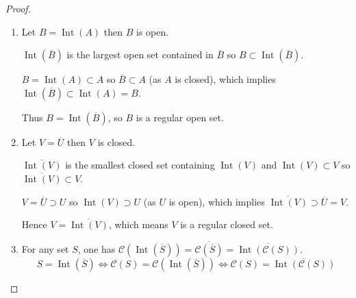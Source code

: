 \begin{proof}
    \begin{enumerate}[leftmargin=*,label={(\alph*)},itemsep=0pt]
        \item Let \( B = \operatorname{Int}(A) \) then \(B\) is open.

              \( \operatorname{Int}(\overline{B}) \) is the largest open set contained in \( \overline{B} \) so \( B \subset \operatorname{Int}(\overline{B}) \).


              \( B = \operatorname{Int}(A) \subset A \) so \( \overline{B} \subset A \) (as \(A\) is closed), which implies \( \operatorname{Int}(\overline{B}) \subset \operatorname{Int}(A) = B \).

              Thus \( B = \operatorname{Int}(\overline{B}) \), so \( B \) is a regular open set.
        \item Let \( V = \overline{U} \) then \( V \) is closed.

              \( \overline{\operatorname{Int}(V)} \) is the smallest closed set containing \( \operatorname{Int}(V) \) and \( \operatorname{Int}(V) \subset V \) so \( \overline{\operatorname{Int}(V)} \subset V \).

              \( V = \overline{U} \supset U \) so \( \operatorname{Int}(V) \supset U \) (as \(U\) is open), which implies \( \overline{\operatorname{Int}(V)} \supset \overline{U} = V \).

              Hence \( V = \overline{\operatorname{Int}(V)} \), which means \( V \) is a regular closed set.
        \item For any set \(S\), one has \( \mathscr{C}(\operatorname{Int}(\overline{S})) = \overline{\mathscr{C}(\overline{S})} = \overline{\operatorname{Int}(\mathscr{C}(S))} \).
              \[
                  S = \operatorname{Int}(\overline{S}) \iff \mathscr{C}(S) = \mathscr{C}(\operatorname{Int}(\overline{S})) \iff \mathscr{C}(S) = \overline{\operatorname{Int}(\mathscr{C}(S))}
              \]


\end{enumerate}
\end{proof}
